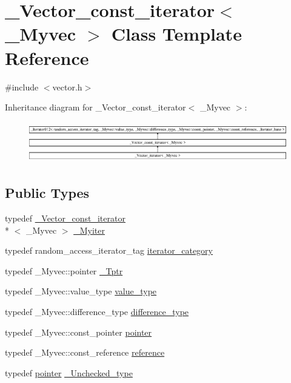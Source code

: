 \hypertarget{class___vector__const__iterator}{\section{\+\_\+\+Vector\+\_\+const\+\_\+iterator$<$ \+\_\+\+Myvec $>$ Class Template Reference}
\label{class___vector__const__iterator}
}


{\ttfamily \#include $<$vector.\+h$>$}

Inheritance diagram for \+\_\+\+Vector\+\_\+const\+\_\+iterator$<$ \+\_\+\+Myvec $>$\+:\begin{figure}[H]
\begin{center}
\leavevmode
\includegraphics[height=1.814255cm]{class___vector__const__iterator}
\end{center}
\end{figure}
\subsection*{Public Types}
\begin{DoxyCompactItemize}
\item 
typedef \hyperlink{class___vector__const__iterator}{\+\_\+\+Vector\+\_\+const\+\_\+iterator}\\*
$<$ \+\_\+\+Myvec $>$ \hyperlink{class___vector__const__iterator_ac41cce1a95dfa665c2d7237fd94d776b}{\+\_\+\+Myiter}
\item 
typedef random\+\_\+access\+\_\+iterator\+\_\+tag \hyperlink{class___vector__const__iterator_a3e45b76a1bb5d1c6adb70bf8d924d1e5}{iterator\+\_\+category}
\item 
typedef \+\_\+\+Myvec\+::pointer \hyperlink{class___vector__const__iterator_a9b6960b4fe0656e2e83c54e6c7757a15}{\+\_\+\+Tptr}
\item 
typedef \+\_\+\+Myvec\+::value\+\_\+type \hyperlink{class___vector__const__iterator_ae488763bcaee2e0738351caacc5c8922}{value\+\_\+type}
\item 
typedef \+\_\+\+Myvec\+::difference\+\_\+type \hyperlink{class___vector__const__iterator_a4fad8668028c0db06eda92c190eeca39}{difference\+\_\+type}
\item 
typedef \+\_\+\+Myvec\+::const\+\_\+pointer \hyperlink{class___vector__const__iterator_a301a1187c227c820bd86335496229e6a}{pointer}
\item 
typedef \+\_\+\+Myvec\+::const\+\_\+reference \hyperlink{class___vector__const__iterator_ad622d2f855c02a5b3b2f49f39cbbabf4}{reference}
\item 
typedef \hyperlink{class___vector__const__iterator_a301a1187c227c820bd86335496229e6a}{pointer} \hyperlink{class___vector__const__iterator_a17897ed20e5a6c25f9b383d0f0a4bb9d}{\+\_\+\+Unchecked\+\_\+type}
\end{DoxyCompactItemize}
